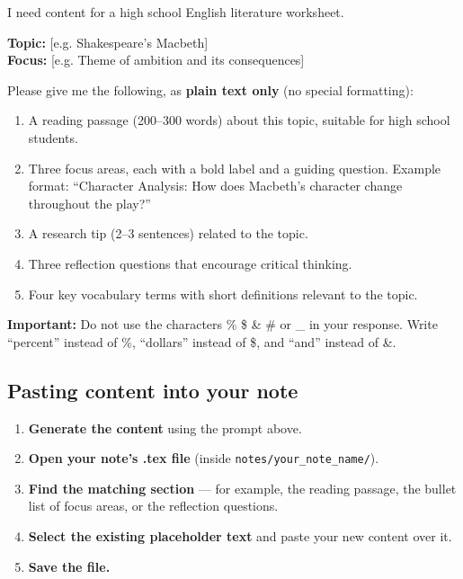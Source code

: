 \documentclass[a4paper,11pt]{article}
\begin{document}
\begin{stepbox}
I need content for a high school English literature worksheet.

\textbf{Topic:} [e.g. Shakespeare's Macbeth]\\
\textbf{Focus:} [e.g. Theme of ambition and its consequences]

Please give me the following, as \textbf{plain text only} (no special formatting):

\begin{enumerate}[itemsep=4pt]
  \item A reading passage (200--300 words) about this topic, suitable for high school students.
  \item Three focus areas, each with a bold label and a guiding question. Example format: ``Character Analysis: How does Macbeth's character change throughout the play?''
  \item A research tip (2--3 sentences) related to the topic.
  \item Three reflection questions that encourage critical thinking.
  \item Four key vocabulary terms with short definitions relevant to the topic.
\end{enumerate}

\textbf{Important:} Do not use the characters \% \$ \& \# or \_ in your response. Write ``percent'' instead of \%, ``dollars'' instead of \$, and ``and'' instead of \&.
\end{stepbox}

\subsection{Pasting content into your note}

\begin{enumerate}[itemsep=6pt]
  \item \textbf{Generate the content} using the prompt above.
  \item \textbf{Open your note's .tex file} (inside \texttt{notes/your\_note\_name/}).
  \item \textbf{Find the matching section} --- for example, the reading passage, the bullet list of focus areas, or the reflection questions.
  \item \textbf{Select the existing placeholder text} and paste your new content over it.
  \item \textbf{Save the file.}
\end{enumerate}
\end{document}
